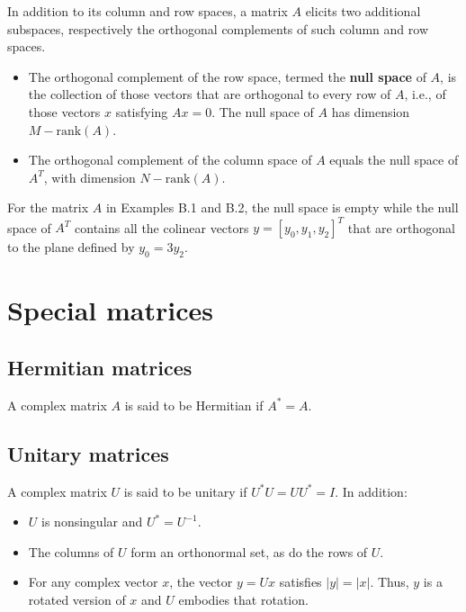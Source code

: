 \documentclass[a4paper, 12pt]{book}
\begin{document}
In addition to its column and row spaces, a matrix $A$ elicits two additional subspaces, respectively the orthogonal complements of such column and row spaces.

\begin{itemize}
    \item The orthogonal complement of the row space, termed the \textbf{null space} of $A$, is the collection of those vectors that are orthogonal to every row of $A$, i.e., of those vectors $x$ satisfying $Ax=0$. The null space of $A$ has dimension $M-\text{rank}(A)$.
    \item The orthogonal complement of the column space of $A$ equals the null space of $A^{T}$, with dimension $N-\text{rank}(A)$.
\end{itemize}

\begin{greenbox}[Example B.3]
For the matrix $A$ in Examples B.1 and B.2, the null space is empty while the null space of $A^{T}$ contains all the colinear vectors $y=[y_{0}, y_{1}, y_{2}]^{T}$ that are orthogonal to the plane defined by $y_{0}=3y_{2}$.
\end{greenbox}

\section{Special matrices}

\subsection{Hermitian matrices}
A complex matrix $A$ is said to be Hermitian if $A^{*}=A$.

\subsection{Unitary matrices}
A complex matrix $U$ is said to be unitary if $U^{*}U=UU^{*}=I.$ In addition:
\begin{itemize}
    \item $U$ is nonsingular and $U^{*}=U^{-1}$.
    \item The columns of $U$ form an orthonormal set, as do the rows of $U$.
    \item For any complex vector $x$, the vector $y=Ux$ satisfies $|y|=|x|$. Thus, $y$ is a rotated version of $x$ and $U$ embodies that rotation.
\end{itemize}
\end{document}
